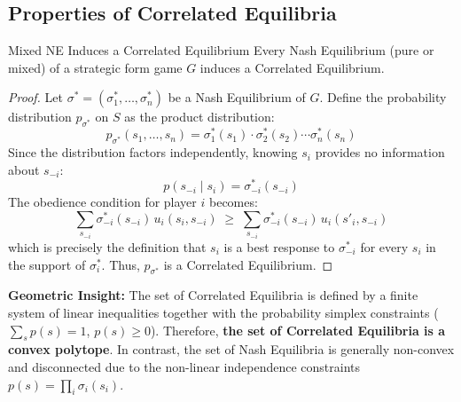 \documentclass[12pt, a4paper]{article}
\begin{document}
\subsection{Properties of Correlated Equilibria}

\begin{thmbox}{Mixed NE Induces a Correlated Equilibrium}
Every Nash Equilibrium (pure or mixed) of a strategic form game $G$ induces a Correlated Equilibrium.
\end{thmbox}

\begin{proof}
Let $\sigma^* = (\sigma_1^*, \dots, \sigma_n^*)$ be a Nash Equilibrium of $G$. Define the probability distribution $p_{\sigma^*}$ on $S$ as the product distribution:
\[
  p_{\sigma^*}(s_1, \dots, s_n) = \sigma_1^*(s_1) \cdot \sigma_2^*(s_2) \cdots \sigma_n^*(s_n)
\]
Since the distribution factors independently, knowing $s_i$ provides no information about $s_{-i}$:
\[
  p(s_{-i} \mid s_i) = \sigma_{-i}^*(s_{-i})
\]
The obedience condition for player $i$ becomes:
\[
  \sum_{s_{-i}} \sigma_{-i}^*(s_{-i}) \, u_i(s_i, s_{-i}) \;\geq\; \sum_{s_{-i}} \sigma_{-i}^*(s_{-i}) \, u_i(s'_i, s_{-i})
\]
which is precisely the definition that $s_i$ is a best response to $\sigma_{-i}^*$ for every $s_i$ in the support of $\sigma_i^*$. Thus, $p_{\sigma^*}$ is a Correlated Equilibrium.
\end{proof}

\begin{intubox}
\textbf{Geometric Insight:}
The set of Correlated Equilibria is defined by a finite system of linear inequalities together with the probability simplex constraints ($\sum_s p(s) = 1$, $p(s) \geq 0$). 
Therefore, \textbf{the set of Correlated Equilibria is a convex polytope}. 
In contrast, the set of Nash Equilibria is generally non-convex and disconnected due to the non-linear independence constraints $p(s) = \prod_i \sigma_i(s_i)$.
\end{intubox}
\end{document}
